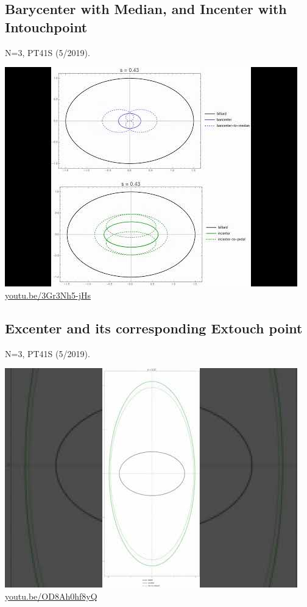 \documentclass[12pt]{amsart}
\begin{document}
\subsection{Barycenter with Median, and Incenter with Intouchpoint}
\label{vid:3Gr3Nh5-jHs}
\noindent N=3, PT41S (5/2019). 
\begin{center}\includegraphics[width=.5\textwidth]{pics/3Gr3Nh5-jHs.jpg} \\ 
\href{https://youtu.be/3Gr3Nh5-jHs}{\url{youtu.be/3Gr3Nh5-jHs}}\end{center}
% 

\subsection{Excenter and its corresponding Extouch point}
\label{vid:OD8Ah0hf8yQ}
\noindent N=3, PT41S (5/2019). 
\begin{center}\includegraphics[width=.5\textwidth]{pics/OD8Ah0hf8yQ.jpg} \\ 
\href{https://youtu.be/OD8Ah0hf8yQ}{\url{youtu.be/OD8Ah0hf8yQ}}\end{center}
% 
\end{document}
